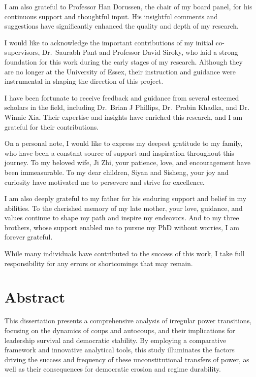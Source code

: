 \documentclass[
  12pt,
]{report}
\begin{document}
I am also grateful to Professor Han Dorussen, the chair of my board
panel, for his continuous support and thoughtful input. His insightful
comments and suggestions have significantly enhanced the quality and
depth of my research.

I would like to acknowledge the important contributions of my initial
co-supervisors, Dr.~Saurabh Pant and Professor David Siroky, who laid a
strong foundation for this work during the early stages of my research.
Although they are no longer at the University of Essex, their
instruction and guidance were instrumental in shaping the direction of
this project.

I have been fortunate to receive feedback and guidance from several
esteemed scholars in the field, including Dr.~Brian J Phillips,
Dr.~Prabin Khadka, and Dr. Winnie Xia. Their expertise and insights have
enriched this research, and I am grateful for their contributions.

On a personal note, I would like to express my deepest gratitude to my
family, who have been a constant source of support and inspiration
throughout this journey. To my beloved wife, Ji Zhi, your patience,
love, and encouragement have been immeasurable. To my dear children,
Siyan and Sisheng, your joy and curiosity have motivated me to persevere
and strive for excellence.

I am also deeply grateful to my father for his enduring support and
belief in my abilities. To the cherished memory of my late mother, your
love, guidance, and values continue to shape my path and inspire my
endeavors. And to my three brothers, whose support enabled me to pursue
my PhD without worries, I am forever grateful.

While many individuals have contributed to the success of this work, I
take full responsibility for any errors or shortcomings that may remain.

\chapter*{Abstract}\label{abstract}

This dissertation presents a comprehensive analysis of irregular power
transitions, focusing on the dynamics of coups and autocoups, and their
implications for leadership survival and democratic stability. By
employing a comparative framework and innovative analytical tools, this
study illuminates the factors driving the success and frequency of these
unconstitutional transfers of power, as well as their consequences for
democratic erosion and regime durability.
\end{document}
